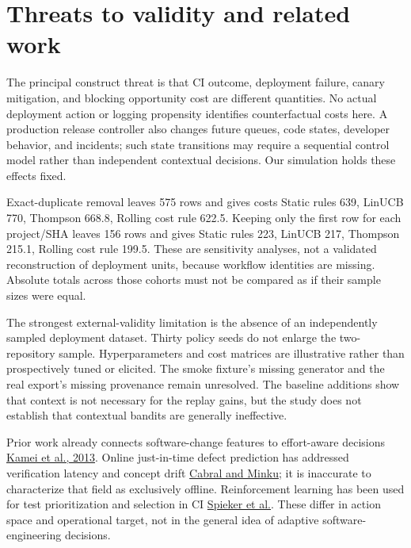 \documentclass[
  10pt,
]{article}
\begin{document}
\section{Threats to validity and related
work}\label{threats-to-validity-and-related-work}

The principal construct threat is that CI outcome, deployment failure,
canary mitigation, and blocking opportunity cost are different
quantities. No actual deployment action or logging propensity identifies
counterfactual costs here. A production release controller also changes
future queues, code states, developer behavior, and incidents; such
state transitions may require a sequential control model rather than
independent contextual decisions. Our simulation holds these effects
fixed.

Exact-duplicate removal leaves 575 rows and gives costs Static rules
639, LinUCB 770, Thompson 668.8, Rolling cost rule 622.5. Keeping only
the first row for each project/SHA leaves 156 rows and gives Static
rules 223, LinUCB 217, Thompson 215.1, Rolling cost rule 199.5. These
are sensitivity analyses, not a validated reconstruction of deployment
units, because workflow identities are missing. Absolute totals across
those cohorts must not be compared as if their sample sizes were equal.

The strongest external-validity limitation is the absence of an
independently sampled deployment dataset. Thirty policy seeds do not
enlarge the two-repository sample. Hyperparameters and cost matrices are
illustrative rather than prospectively tuned or elicited. The smoke
fixture's missing generator and the real export's missing provenance
remain unresolved. The baseline additions show that context is not
necessary for the replay gains, but the study does not establish that
contextual bandits are generally ineffective.

Prior work already connects software-change features to effort-aware
decisions
\href{https://posl.ait.kyushu-u.ac.jp/~kamei/publications/Kamei_TSE2013.pdf}{Kamei
et al., 2013}. Online just-in-time defect prediction has addressed
verification latency and concept drift
\href{https://research.birmingham.ac.uk/en/publications/towards-reliable-online-just-in-time-software-defect-prediction/}{Cabral
and Minku}; it is inaccurate to characterize that field as exclusively
offline. Reinforcement learning has been used for test prioritization
and selection in CI \href{https://arxiv.org/abs/1811.04122}{Spieker et
al.}. These differ in action space and operational target, not in the
general idea of adaptive software-engineering decisions.
\end{document}
